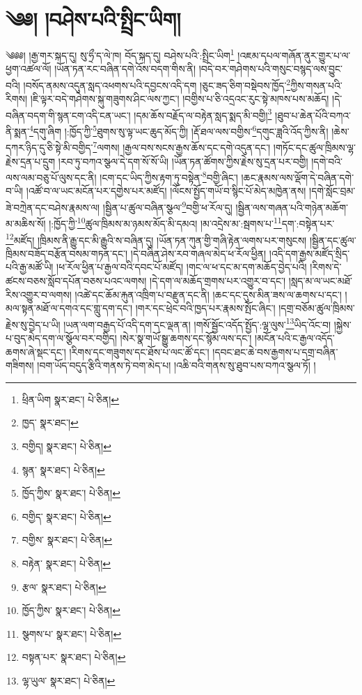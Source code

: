 \setcounter{footnote}{0} 
\chapter{༄༅། །བཤེས་པའི་སྤྲིང་ཡིག།}༄༅༅། །རྒྱ་གར་སྐད་དུ། སུ་ཧྲྀ་ད་ལེ་ཁ། བོད་སྐད་དུ། བཤེས་པའི་:སྤྲིང་ཡིག\footnote{ཕྲིན་ཡིག  སྣར་ཐང་།  པེ་ཅིན། } །འཇམ་དཔལ་གཞོན་ནུར་གྱུར་པ་ལ་ཕྱག་འཚལ་ལོ། །ཡོན་ཏན་རང་བཞིན་དགེ་འོས་བདག་གིས་ནི། །བདེ་བར་གཤེགས་པའི་གསུང་བསྙད་ལས་བྱུང་བའི། །བསོད་ནམས་འདུན་སླད་འཕགས་པའི་དབྱངས་འདི་དག །ཅུང་ཟད་ཅིག་བསྡེབས་ཁྱོད་\footnote{ཁྱད་  སྣར་ཐང་། }ཀྱིས་གསན་པའི་རིགས། །ཇི་ལྟར་བདེ་གཤེགས་སྐུ་གཟུགས་ཤིང་ལས་ཀྱང་། །བགྱིས་པ་ཅི་འདྲའང་རུང་སྟེ་མཁས་པས་མཆོད། །དེ་བཞིན་བདག་གི་སྙན་ངག་འདི་ངན་ཡང་། །དམ་ཆོས་བརྗོད་ལ་བརྟེན་སླད་སྨད་མི་བགྱི།\footnote{བགྱིད།  སྣར་ཐང་།  པེ་ཅིན། } །ཐུབ་པ་ཆེན་པོའི་བཀའ་ནི་སྨན་\footnote{སྙན་  སྣར་ཐང་།  པེ་ཅིན། }དགུ་ཞིག །:ཁྱོད་ཀྱི་\footnote{ཁྱོད་ཀྱིས་  སྣར་ཐང་།  པེ་ཅིན། }ཐུགས་སུ་ལྟ་ཡང་ཆུད་མོད་ཀྱི། །རྡོ་ཐལ་ལས་བགྱིས་\footnote{བགྱིད་  སྣར་ཐང་།  པེ་ཅིན། }དགུང་ཟླའི་འོད་ཀྱིས་ནི། །ཆེས་དཀར་ཉིད་དུ་ཅི་སྟེ་མི་བགྱིད་\footnote{བགྱིས་  སྣར་ཐང་།  པེ་ཅིན། }ལགས། །རྒྱལ་བས་སངས་རྒྱས་ཆོས་དང་དགེ་འདུན་དང་། །གཏོང་དང་ཚུལ་ཁྲིམས་ལྷ་རྗེས་དྲན་པ་དྲུག །རབ་ཏུ་བཀའ་སྩལ་དེ་དག་སོ་སོ་ཡི། །ཡོན་ཏན་ཚོགས་ཀྱིས་རྗེས་སུ་དྲན་པར་བགྱི། །དགེ་བའི་ལས་ལམ་བཅུ་པོ་ལུས་དང་ནི། །ངག་དང་ཡིད་ཀྱིས་རྟག་ཏུ་བསྟེན་\footnote{བརྟེན་  སྣར་ཐང་།  པེ་ཅིན། }བགྱི་ཞིང་། །ཆང་རྣམས་ལས་ལྡོག་དེ་བཞིན་དགེ་བ་ཡི། །འཚོ་བ་ལ་ཡང་མངོན་པར་དགྱེས་པར་མཛོད། །ལོངས་སྤྱོད་གཡོ་བ་སྙིང་པོ་མེད་མཁྱེན་ནས། །དགེ་སློང་བྲམ་ཟེ་བཀྲེན་དང་བཤེས་རྣམས་ལ། །སྦྱིན་པ་ཚུལ་བཞིན་སྩལ་\footnote{རྩལ་  སྣར་ཐང་།  པེ་ཅིན། }བགྱི་ཕ་རོལ་དུ། །སྦྱིན་ལས་གཞན་པའི་གཉེན་མཆོག་མ་མཆིས་སོ། །:ཁྱོད་ཀྱི་\footnote{ཁྱོད་ཀྱིས་  སྣར་ཐང་།  པེ་ཅིན། }ཚུལ་ཁྲིམས་མ་ཉམས་མོད་མི་དམའ། །མ་འདྲེས་མ་:སྦགས་པ་\footnote{སྩགས་པ་  སྣར་ཐང་།  པེ་ཅིན། }དག་:བསྟེན་པར་\footnote{བསྟན་པར་  སྣར་ཐང་།  པེ་ཅིན། }མཛོད། །ཁྲིམས་ནི་རྒྱུ་དང་མི་རྒྱུའི་ས་བཞིན་དུ། །ཡོན་ཏན་ཀུན་གྱི་གཞི་རྟེན་ལགས་པར་གསུངས། །སྦྱིན་དང་ཚུལ་ཁྲིམས་བཟོད་བརྩོན་བསམ་གཏན་དང་། །དེ་བཞིན་ཤེས་རབ་གཞལ་མེད་ཕ་རོལ་ཕྱིན། །འདི་དག་རྒྱས་མཛོད་སྲིད་པའི་རྒྱ་མཚོ་ཡི། །ཕ་རོལ་ཕྱིན་པ་རྒྱལ་བའི་དབང་པོ་མཛོད། །གང་ལ་ཕ་དང་མ་དག་མཆོད་བྱེད་པའི། །རིགས་དེ་ཚངས་བཅས་སློབ་དཔོན་བཅས་པའང་ལགས། །དེ་དག་ལ་མཆོད་གྲགས་པར་འགྱུར་བ་དང་། །སླད་མ་ལ་ཡང་མཐོ་རིས་འགྱུར་བ་ལགས། །འཚེ་དང་ཆོམ་རྐུན་འཁྲིག་པ་བརྫུན་དང་ནི། །ཆང་དང་དུས་མིན་ཟས་ལ་ཆགས་པ་དང་། །མལ་སྟན་མཐོ་ལ་དགའ་དང་གླུ་དག་དང་། །གར་དང་ཕྲེང་བའི་ཁྱད་པར་རྣམས་སྤོང་ཞིང་། །དགྲ་བཅོམ་ཚུལ་ཁྲིམས་རྗེས་སུ་བྱེད་པ་ཡི། །ཡན་ལག་བརྒྱད་པོ་འདི་དག་དང་ལྡན་ན། །གསོ་སྦྱོང་འདོད་སྤྱོད་:ལྷ་ལུས་\footnote{ལྷ་ཡུལ་  སྣར་ཐང་།  པེ་ཅིན། }ཡིད་འོང་བ། །སྐྱེས་པ་བུད་མེད་དག་ལ་སྩོལ་བར་བགྱིད། །སེར་སྣ་གཡོ་སྒྱུ་ཆགས་དང་སྙོམ་ལས་དང་། །མངོན་པའི་ང་རྒྱལ་འདོད་ཆགས་ཞེ་སྡང་དང་། །རིགས་དང་གཟུགས་དང་ཐོས་པ་ལང་ཚོ་དང་། །དབང་ཐང་ཆེ་བས་རྒྱགས་པ་དགྲ་བཞིན་གཟིགས། །བག་ཡོད་བདུད་རྩིའི་གནས་ཏེ་བག་མེད་པ། །འཆི་བའི་གནས་སུ་ཐུབ་པས་བཀའ་སྩལ་ཏོ། །
